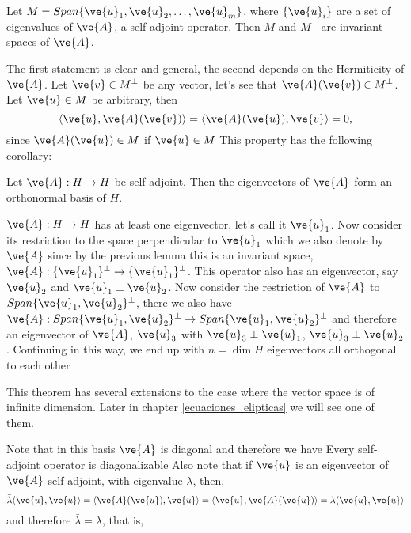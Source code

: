 {\blem
Let $M = Span\{\ve{u}_{1},\ve{u}_2,\dots,\ve{u}_m\}$, where $\{\ve{u}_i\}$
are a set of eigenvalues of $\ve{A}$, a self-adjoint operator.
Then $M$ and $M^{\perp}$ are invariant spaces of $\ve{A}$.
\elem

\bpru 
The first statement is clear and general, the second depends on the
Hermiticity of $\ve{A}$. Let $\ve{v} \in M^{\perp}$ be any vector, let's see
that $\ve{A}(\ve{v}) \in M^{\perp}$. Let $\ve{u} \in M$ be arbitrary, then
\begin{equation}
  \langle \ve{u},\ve{A}(\ve{v}) \rangle = \langle \ve{A}(\ve{u}),\ve{v} \rangle = 0,
\end{equation}
%
since $\ve{A}(\ve{u}) \in M$ if $\ve{u} \in M$
\epru
\espa
This property has the following corollary:

\bcor
Let $\ve{A}:H \to H$ be self-adjoint. Then the eigenvectors of $\ve{A}$ form an orthonormal basis of $H$.
\ecor

\bpru
$\ve{A}: H \to H$ has at least one eigenvector, let's call it $\ve{u}_1$. 
Now consider its restriction to the space perpendicular to $\ve{u}_1$
which we also denote by $\ve{A}$ since by the previous lemma this is
an invariant space, $\ve{A}:\{\ve{u}_1\}^{\perp} \to \{\ve{u}_1\}^{\perp}$.
This operator also has an eigenvector, say $\ve{u}_2$ and 
$\ve{u}_1 \perp \ve{u}_2$. Now consider the restriction of $\ve{A}$ to
$Span\{\ve{u}_1,\ve{u}_2\}^{\perp}$, there we also have 
$\ve{A}:Span\{\ve{u}_1,\ve{u}_2\}^{\perp} \to Span\{\ve{u}_1,\ve{u}_2\}^{\perp}$
and therefore an eigenvector of $\ve{A}$, $\ve{u}_3$ with 
$\ve{u}_3 \perp \ve{u}_1$, $\ve{u}_3 \perp \ve{u}_2$.
Continuing in this way, we end up with $n = \dim H$ eigenvectors all
orthogonal to each other
\epru

This theorem has several extensions to the case where the vector space is
of infinite dimension. 
Later in chapter \ref{ecuaciones_elipticas} we will see one of them.

Note that in this basis $\ve{A}$ is diagonal and therefore we have
\bcor
Every self-adjoint operator is diagonalizable
\ecor
%
Also note that if $\ve{u}$ is an eigenvector of $\ve{A}$ self-adjoint,
with eigenvalue $\lambda$, then,
\begin{equation} 
  \bar{\lambda} \langle \ve{u},\ve{u} \rangle = \langle \ve{A}(\ve{u}),\ve{u} \rangle
                               = \langle \ve{u},\ve{A}(\ve{u})\rangle
                               = \lambda \langle \ve{u},\ve{u} \rangle
\end{equation}
and therefore $\bar{\lambda} = \lambda$, that is,
    
}
